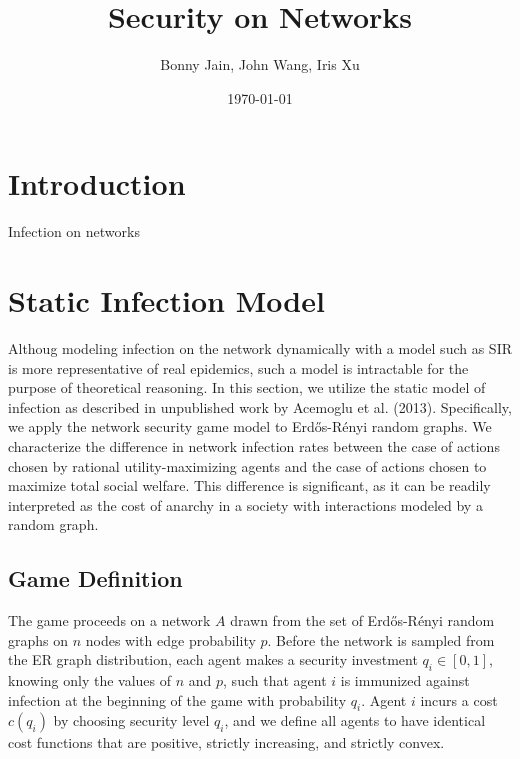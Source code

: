 \documentclass{article}
\title{Security on Networks}
\date{\today}
\author{Bonny Jain, John Wang, Iris Xu}
\theoremstyle{plain}
\begin{document}
  \maketitle

\section{Introduction}

Infection on networks 

\section{Static Infection Model}

Althoug modeling infection on the network dynamically with a model such as SIR is more representative of real epidemics, such a model is intractable for the purpose of theoretical reasoning. In this section, we utilize the static model of infection as described in unpublished work by Acemoglu et al. (2013). Specifically, we apply the network security game model to Erd\H{o}s-R\'{e}nyi random graphs. We characterize the difference in network infection rates between the case of actions chosen by rational utility-maximizing agents and the case of actions chosen to maximize total social welfare. This difference is significant, as it can be readily interpreted as the cost of anarchy in a society with interactions modeled by a random graph. 

\subsection{Game Definition}

The game proceeds on a network $A$ drawn from the set of Erd\H{o}s-R\'{e}nyi random graphs on $n$ nodes with edge probability $p$. Before the network is sampled from the ER graph distribution, each agent makes a security investment $q_i \in [0, 1]$, knowing only the values of $n$ and $p$, such that agent $i$ is immunized against infection at the beginning of the game with probability $q_i$. Agent $i$ incurs a cost $c(q_i)$ by choosing security level $q_i$, and we define all agents to have identical cost functions that are positive, strictly increasing, and strictly convex. 
\end{document}

